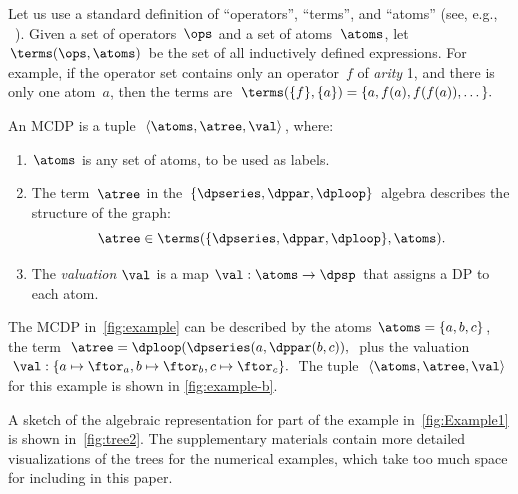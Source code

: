 Let us use a standard definition of ``operators'', ``terms'',
and ``atoms'' (see, e.g., ~\cite[p.41]{jezek08}). Given a set
of operators~$\ops$ and a set of atoms~$\atoms$, let~$\terms(\ops,\atoms)$
be the set of all inductively defined expressions. For example, if
the operator set contains only an operator~$f$ of \emph{arity} 1,
and there is only one atom~$a$, then the terms are $\terms(\{f\},\{a\})=\{a,f(a),f(f(a)),\dots\}.$



\begin{definition}
\label{def:MCDP-algebraic}An MCDP is a tuple~$\left\langle \atoms,\atree,\val\right\rangle $,
where:
\begin{enumerate}
\item $\atoms$ is any set of atoms, to be used as labels.
\item The term~$\atree$ in the $\{\dpseries,\dppar,\dploop\}$ algebra
describes the structure of the graph:
\[
\atree\in\terms(\{\dpseries,\dppar,\dploop\},\atoms).
\]
\item The \emph{valuation} $\val$ is a map $\val:\atoms\rightarrow\dpsp$
that assigns a DP to each atom.
\end{enumerate}
\end{definition}
\begin{example}
The MCDP in~\cref{fig:example} can be described by the atoms
$\atoms=\{a,b,c\}$, the term $\atree=\dploop(\dpseries(a,\dppar(b,c)),$
plus the valuation $\val:\{a\mapsto\ftor_{a},b\mapsto\ftor_{b},c\mapsto\ftor_{c}\}.$
The tuple~$\left\langle \atoms,\atree,\val\right\rangle $ for this
example is shown in \cref{fig:example-b}.
\end{example}
\begin{example}
A sketch of the algebraic representation for part of the example in~\cref{fig:Example1}
is shown in~\cref{fig:tree2}. The supplementary materials contain
more detailed visualizations of the trees for the numerical examples,
which take too much space for including in this paper.
\end{example}
